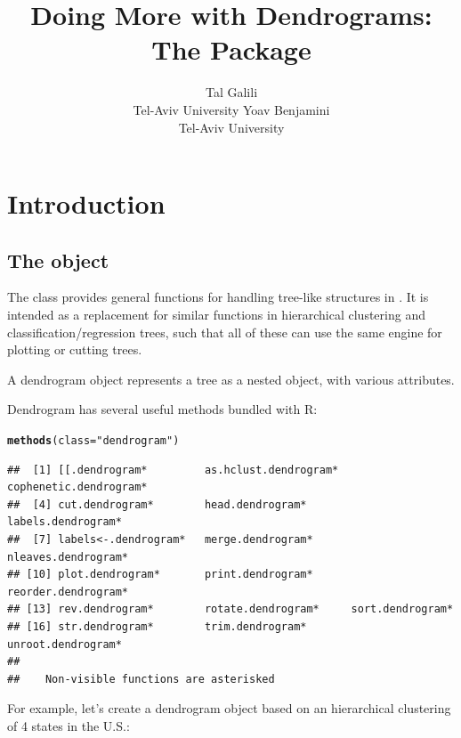 \documentclass[shortnames,nojss,article]{jss}\usepackage{graphicx, color}
\author{Tal Galili\\Tel-Aviv University \And Yoav Benjamini\\Tel-Aviv University}
\title{Doing More with Dendrograms:\\ The \pkg{dendextend} \proglang{R} Package}
\makeatletter
\newcommand{\hlfunctioncall}[1]{\textcolor[rgb]{0.501960784313725,0,0.329411764705882}{\textbf{#1}}}%
\newcommand{\hlstring}[1]{\textcolor[rgb]{0.6,0.6,1}{#1}}%
\newenvironment{kframe}{%
 \def\at@end@of@kframe{}%
 \ifinner\ifhmode%
  \def\at@end@of@kframe{\end{minipage}}%
  \begin{minipage}{\columnwidth}%
 \fi\fi%
 \def\FrameCommand##1{\hskip\@totalleftmargin \hskip-\fboxsep
 \colorbox{shadecolor}{##1}\hskip-\fboxsep
     \hskip-\linewidth \hskip-\@totalleftmargin \hskip\columnwidth}%
 \MakeFramed {\advance\hsize-\width
   \@totalleftmargin\z@ \linewidth\hsize
   \@setminipage}}%
 {\par\unskip\endMakeFramed%
 \at@end@of@kframe}
\newenvironment{knitrout}{}{} %
\makeatother
\begin{document}
\vspace*{-0.25cm}



\section{Introduction}

\subsection{The  object}


The  class provides general functions for handling tree-like structures in  \citep{R:Main}. It is intended as a replacement for similar functions in hierarchical clustering and classification/regression trees, such that all of these can use the same engine for plotting or cutting trees.

A dendrogram object represents a tree as a nested  object, with various attributes.

Dendrogram has several useful methods bundled with R:

\begin{knitrout}
\color{fgcolor}\begin{kframe}
\begin{alltt}
\hlfunctioncall{methods}(class = \hlstring{"dendrogram"})
\end{alltt}
\begin{verbatim}
##  [1] [[.dendrogram*         as.hclust.dendrogram*  cophenetic.dendrogram*
##  [4] cut.dendrogram*        head.dendrogram*       labels.dendrogram*    
##  [7] labels<-.dendrogram*   merge.dendrogram*      nleaves.dendrogram*   
## [10] plot.dendrogram*       print.dendrogram*      reorder.dendrogram*   
## [13] rev.dendrogram*        rotate.dendrogram*     sort.dendrogram*      
## [16] str.dendrogram*        trim.dendrogram*       unroot.dendrogram*    
## 
##    Non-visible functions are asterisked
\end{verbatim}
\end{kframe}
\end{knitrout}


For example, let's create a dendrogram object based on an hierarchical clustering of 4 states in the U.S.:
\end{document}

